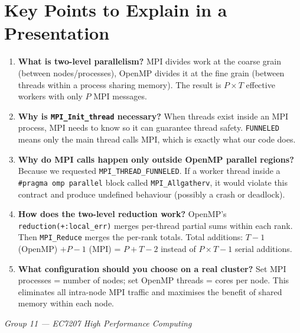 \documentclass[12pt,a4paper]{article}
\begin{document}
\section{Key Points to Explain in a Presentation}

\begin{enumerate}
    \item \textbf{What is two-level parallelism?}  MPI divides work at the
          coarse grain (between nodes/processes), OpenMP divides it at the fine
          grain (between threads within a process sharing memory).  The result
          is $P \times T$ effective workers with only $P$ MPI messages.
    \item \textbf{Why is \texttt{MPI\_Init\_thread} necessary?}  When threads
          exist inside an MPI process, MPI needs to know so it can guarantee
          thread safety.  \texttt{FUNNELED} means only the main thread calls
          MPI, which is exactly what our code does.
    \item \textbf{Why do MPI calls happen only outside OpenMP parallel regions?}
          Because we requested \texttt{MPI\_THREAD\_FUNNELED}.  If a worker
          thread inside a \texttt{\#pragma omp parallel} block called
          \texttt{MPI\_Allgatherv}, it would violate this contract and produce
          undefined behaviour (possibly a crash or deadlock).
    \item \textbf{How does the two-level reduction work?}  OpenMP's
          \texttt{reduction(+:local\_err)} merges per-thread partial sums within
          each rank.  Then \texttt{MPI\_Reduce} merges the per-rank totals.
          Total additions: $T-1$ (OpenMP) $+ P-1$ (MPI) = $P+T-2$ instead
          of $P \times T - 1$ serial additions.
    \item \textbf{What configuration should you choose on a real cluster?}
          Set MPI processes = number of nodes; set OpenMP threads = cores per
          node.  This eliminates all intra-node MPI traffic and maximises
          the benefit of shared memory within each node.
\end{enumerate}

\vfill
\begin{center}
    \small\textit{Group 11 — EC7207 High Performance Computing}
\end{center}
\end{document}
